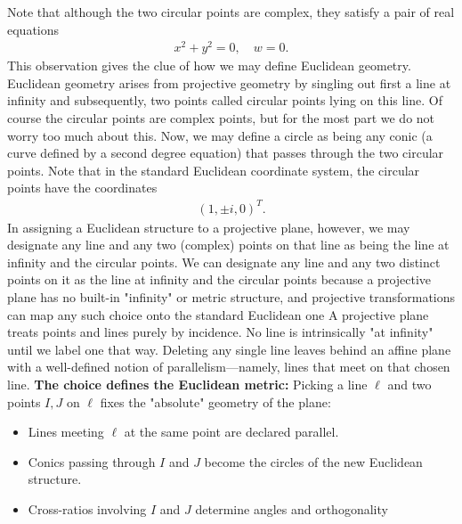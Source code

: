 \documentclass{report}
\begin{document}
\begin{itemize}
            \bigbreak \noindent 
            Note that although the two circular points are complex, they satisfy a pair of real equations
            \begin{align*}
                x^{2} + y^{2} = 0, \quad w= 0 
            .\end{align*}
            This observation gives the clue of how we may define Euclidean geometry. Euclidean geometry arises from projective geometry by singling out first a line at infinity and subsequently, two points called circular points lying on this line. Of course the circular points are complex points, but for the most part we do not worry too much about this.
            \bigbreak \noindent 
            Now, we may define a circle as being any conic (a curve defined by a second degree equation) that passes through the two circular points. Note that in the standard Euclidean coordinate system, the circular points have the coordinates
            \begin{align*}
                (1, \pm i, 0)^{T}
            .\end{align*}
            In assigning a Euclidean structure to a projective plane, however, we may designate any line and any two (complex) points on that line as being the line at infinity and the circular points.
            \bigbreak \noindent 
            We can designate any line and any two distinct points on it as the line at infinity and the circular points because a projective plane has no built-in "infinity" or metric structure, and projective transformations can map any such choice onto the standard Euclidean one
            \bigbreak \noindent 
            A projective plane treats points and lines purely by incidence. No line is intrinsically "at infinity" until we label one that way.
            \bigbreak \noindent 
            Deleting any single line leaves behind an affine plane with a well-defined notion of parallelism—namely, lines that meet on that chosen line.
            \bigbreak \noindent 
            \textbf{The choice defines the Euclidean metric:} Picking a line \(\mathbf{\ell} \) and two points \(I, J\) on \(\ell \) fixes the "absolute" geometry of the plane:
            \begin{itemize}
                \item Lines meeting \(\mathbf{\ell} \) at the same point are declared parallel.
                \item Conics passing through \(I\) and \(J\) become the circles of the new Euclidean structure.
                \item Cross-ratios involving \(I\) and \(J\) determine angles and orthogonality

\end{itemize}
\end{itemize}
\end{document}
